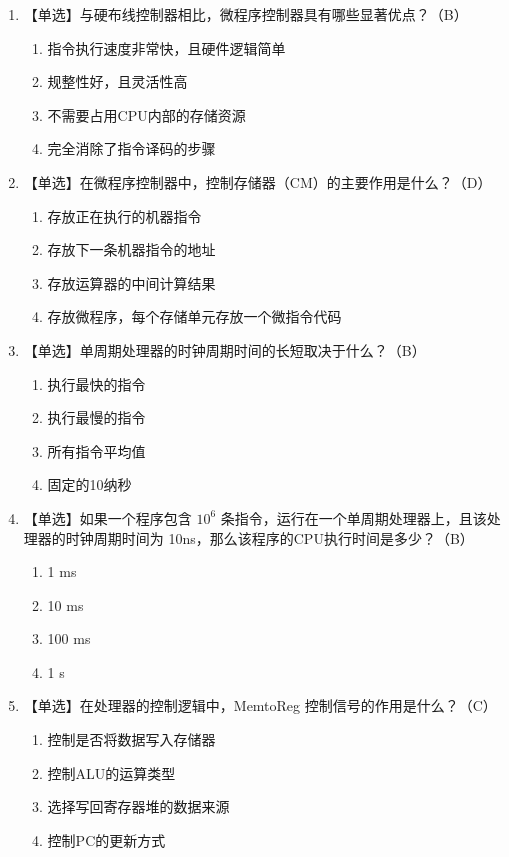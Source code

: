 \documentclass[12pt, a4paper]{article}
\begin{document}
\begin{enumerate}[label=\arabic*.]
    \item 【单选】与硬布线控制器相比，微程序控制器具有哪些显著优点？（B）
    \begin{enumerate}[label=\Alph*.]
        \item 指令执行速度非常快，且硬件逻辑简单 \item 规整性好，且灵活性高
        \item 不需要占用CPU内部的存储资源 \item 完全消除了指令译码的步骤
    \end{enumerate}

    \item 【单选】在微程序控制器中，控制存储器（CM）的主要作用是什么？（D）
    \begin{enumerate}[label=\Alph*.]
        \item 存放正在执行的机器指令 \item 存放下一条机器指令的地址
        \item 存放运算器的中间计算结果 \item 存放微程序，每个存储单元存放一个微指令代码
    \end{enumerate}

    \item 【单选】单周期处理器的时钟周期时间的长短取决于什么？（B）
    \begin{enumerate}[label=\Alph*.]
        \item 执行最快的指令 \item 执行最慢的指令 \item 所有指令平均值 \item 固定的10纳秒
    \end{enumerate}

    \item 【单选】如果一个程序包含 $10^6$ 条指令，运行在一个单周期处理器上，且该处理器的时钟周期时间为 10ns，那么该程序的CPU执行时间是多少？（B）
    \begin{enumerate}[label=\Alph*.]
        \item 1 ms \item 10 ms \item 100 ms \item 1 s
    \end{enumerate}

    \item 【单选】在处理器的控制逻辑中，MemtoReg 控制信号的作用是什么？（C）
    \begin{enumerate}[label=\Alph*.]
        \item 控制是否将数据写入存储器 \item 控制ALU的运算类型
        \item 选择写回寄存器堆的数据来源 \item 控制PC的更新方式
    \end{enumerate}


\end{enumerate}
\end{document}
